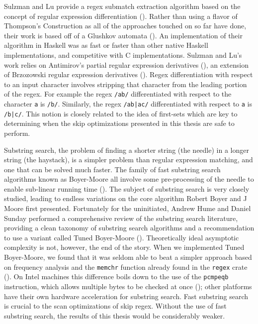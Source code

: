 Sulzman and Lu provide a regex submatch extraction algorithm
based on the concept of regular expression differentiation
(\cite{Sulzmann2012}). Rather than using a flavor of Thompson's
Construction as all of the approaches touched on so far have done,
their work is based off of a Glushkov automata (\cite{Allauzen2006}).
An implementation of their algorithm in Haskell was as fast or
faster than other native Haskell implementations, and competitive
with C implementations. Sulzman and Lu's work relies on
Antimirov's partial regular expression derivatives (\cite{Antimirov1996}),
an extension of Brzozowski regular expression derivatives
(\cite{Brzozowski1964}). Regex differentiation with respect
to an input character involves stripping that character from
the leading portion of the regex. For example the regex \verb'/ab/'
differentiated with respect to the character \verb'a' is \verb'/b/'.
Similarly, the regex \verb'/ab|ac/' differentiated with respect to
\verb'a' is \verb'/b|c/'. This notion is closely related to the
idea of first-sets which are key to determining when
the skip optimizations presented in this thesis are safe to perform.

Substring search, the problem of finding a shorter string (the needle) in
a longer string (the haystack), is a simpler problem than regular expression
matching, and one that can be solved much faster. The family of fast substring
search algorithms known as Boyer-Moore all involve some pre-processing of
the needle to enable sub-linear running time (\cite{Boyer1977}).
The subject of substring search is very closely studied, leading to
endless variations on the core algorithm Robert Boyer and J Moore
first presented. Fortunately for the uninitiated, Andrew Hume and
Daniel Sunday performed a comprehensive review of the substring search
literature, providing a clean taxonomy of substring search algorithms
and a recommendation to use a variant called Tuned Boyer-Moore
(\cite{Hume1991}). Theoretically ideal asymptotic complexity is not,
however, the end of the story. When we implemented Tuned Boyer-Moore,
we found that it was seldom able to beat a simpler approach based on
frequency analysis and the \verb'memchr' function already found in
the \verb'regex' crate (\cite{GallantRegex}). On Intel machines this
difference boils down to the use of the \verb'pcmpeqb' instruction,
which allows multiple bytes to be checked at once
(\cite{IntelInstructionManual}); other platforms have their own hardware
acceleration for substring search. Fast substring search is crucial to
the scan optimizations of skip regex. Without the use of fast substring
search, the results of this thesis would be considerably weaker.

